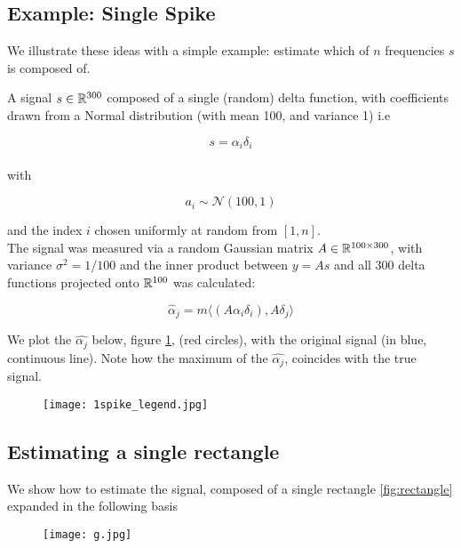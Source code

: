 \subsection{Example: Single Spike}
We illustrate these ideas with a simple example: estimate which of \(n\) frequencies \(s\) is composed of.

A signal \(s \in {\mathbb{R}}^{300}\) composed of a single (random) delta function, with coefficients drawn from a Normal distribution (with mean 100, and variance 1) i.e 

\begin{equation}
s = \alpha_i \delta_i
\end{equation}
\\
with 

\begin{equation}
a_i \sim \mathcal{N}\left(100, 1\right)
\end{equation}

and the index \(i\) chosen uniformly at random from \([1, n]\).
\\
The signal was measured via a random Gaussian matrix \(A \in {\mathbb{R}}^{100 \times 300}\), with variance \(\sigma^2 = 1/
100 \) and the inner product between \(y = As\) and all 300 delta functions projected onto \({\mathbb{R}}^{100}\) was calculated:

\begin{equation}
\hat{\alpha}_j = m\langle (A\alpha_i\delta_i), A\delta_j \rangle
\end{equation} 

We plot the \(\hat{\alpha_j}\) below, figure \ref{fig:new_basis_25}, (red circles), with the original signal (in blue, continuous line). Note how the maximum of the \(\hat{\alpha_j}\), coincides with the true signal.

\begin{figure}[h]
\centering
\texttt{[image: 1spike\_legend.jpg]}
\caption{}
\label{fig:new_basis_25}
\end{figure}

\subsection{Estimating a single rectangle}

We show how to estimate the signal, composed of a single rectangle \eqref{fig:rectangle} expanded in the following basis

\begin{figure}[h]
\centering
\texttt{[image: g.jpg]}
\caption{}
\label{fig:rectangle}
\end{figure}

